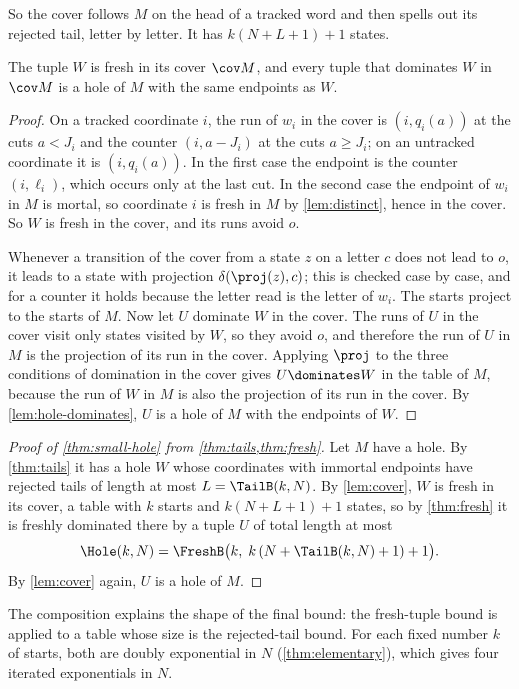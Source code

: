 So the cover follows $M$ on the head of a tracked word and then spells out
its rejected tail, letter by letter. It has $k(N+L+1)+1$ states.

\begin{lemma}[Cover]\label{lem:cover}
The tuple $W$ is fresh in its cover $\cov M$, and every tuple that dominates
$W$ in $\cov M$ is a hole of $M$ with the same endpoints as $W$.
\end{lemma}

\begin{proof}
On a tracked coordinate $i$, the run of $w_i$ in the cover is $(i,q_i(a))$
at the cuts $a<J_i$ and the counter $(i,a-J_i)$ at the cuts $a\ge J_i$; on an
untracked coordinate it is $(i,q_i(a))$. In the first case the endpoint is
the counter $(i,\ell_i)$, which occurs only at the last cut. In the
second case the endpoint of $w_i$ in $M$ is mortal, so coordinate $i$ is
fresh in $M$ by \cref{lem:distinct}, hence in the cover. So $W$ is fresh in
the cover, and its runs avoid $o$.

Whenever a transition of the cover from a state $z$ on a letter $c$ does not
lead to $o$, it leads to a state with projection $\delta(\proj(z),c)$; this is
checked case by case, and for a counter it holds because the letter read is
the letter of $w_i$. The starts project to the starts of $M$. Now let $U$
dominate $W$ in the cover. The runs of $U$ in the cover visit only states
visited by $W$, so they avoid $o$, and therefore the run of $U$ in $M$ is the
projection of its run in the cover. Applying $\proj$ to the three conditions of
domination in the cover gives $U\dominates W$ in the table of $M$, because
the run of $W$ in $M$ is also the projection of its run in the cover. By
\cref{lem:hole-dominates}, $U$ is a hole of $M$ with the endpoints of $W$.
\end{proof}

\begin{proof}[Proof of \cref{thm:small-hole} from
\cref{thm:tails,thm:fresh}]
Let $M$ have a hole. By \cref{thm:tails} it has a hole $W$ whose coordinates
with immortal endpoints have rejected tails of length at most
$L=\TailB(k,N)$. By \cref{lem:cover}, $W$ is fresh in its cover, a table with
$k$ starts and $k(N+L+1)+1$ states, so by \cref{thm:fresh} it is freshly
dominated there by a tuple $U$ of total length at most
\begin{equation}\label{eq:hole-bound}
  \Hole(k,N)=\FreshB\bigl(k,\;k\,(N+\TailB(k,N)+1)+1\bigr).
\end{equation}
By \cref{lem:cover} again, $U$ is a hole of $M$.
\end{proof}

The composition explains the shape of the final bound: the fresh-tuple bound
is applied to a table whose size is the rejected-tail bound. For each fixed
number $k$ of starts, both are doubly exponential in $N$
(\cref{thm:elementary}), which gives four iterated exponentials in $N$.
